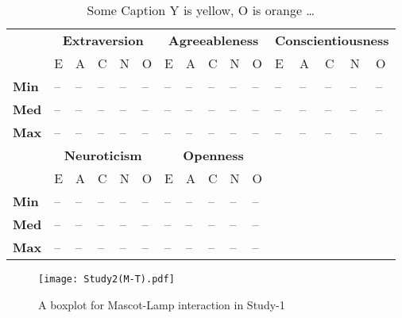 \begin{table}[H]
    \renewcommand{\arraystretch}{1.2}
    \caption{Some Caption Y is yellow, O is orange \ldots}
    \label{table:medianMT2}
    \begin{center}
        \begin{tabular}{p{}|
        p{}|p{}|p{}|p{}|p{}||
        p{}|p{}|p{}|p{}|p{}||
        p{}|p{}|p{}|p{}|p{}|}
            \cline{2-16}
            & \multicolumn{5}{c||}{\textbf{Extraversion}} & \multicolumn{5}{c||}{\textbf{Agreeableness}}
            & \multicolumn{5}{c|}{\textbf{Conscientiousness}} \\
            \cline{2-16}
            & E & A & C & N & O  			    & E & A & C & N & O   	 	& E & A & C & N & O      \\
            \cline{2-16}
            \textbf{Min}  	& -- & -- & -- & -- & -- 		& -- & -- & -- & -- & --  	& -- & -- & -- & -- & --  \\
            \textbf{Med} 	& -- & -- & -- & -- & -- 		& -- & -- & -- & -- & --  	& -- & -- & -- & -- & --  \\
            \textbf{Max}	& -- & -- & -- & -- & -- 		& -- & -- & -- & -- & --  	& -- & -- & -- & -- & -- \\
            \cline{2-16}
            \cline{2-11}
            &  \multicolumn{5}{|c||}{\textbf{Neuroticism}} & \multicolumn{5}{|c||}{\textbf{Openness}} \\
            \cline{2-11}
            & E & A & C & N & O  			& E & A & C & N & O     		\\
            \cline{2-11}
            \textbf{Min} 	& -- & -- & -- & -- & -- 		& -- & -- & -- & -- & -- 	\\
            \textbf{Med}    & -- & -- & -- & -- & -- 	    & -- & -- & -- & -- & -- 	\\
            \textbf{Max}  	& -- & -- & -- & -- & -- 		& -- & -- & -- & -- & --  	\\
            \cline{2-11}
        \end{tabular}
    \end{center}
\end{table}

\begin{figure}[H]
    \centering
    \texttt{[image: Study2(M-T).pdf]}
    \caption{A boxplot for Mascot-Lamp interaction in Study-1}
    \label{fig:MT2}
\end{figure}

